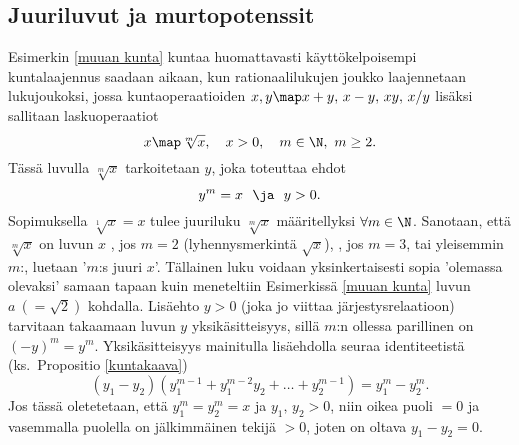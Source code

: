 \subsection*{Juuriluvut ja murtopotenssit}

Esimerkin \ref{muuan kunta} kuntaa huomattavasti käyttökelpoisempi kuntalaajennus saadaan
aikaan, kun rationaalilukujen joukko laajennetaan lukujoukoksi, jossa kuntaoperaatioiden
$x,y \map x+y,\,x-y,\,xy,\,x/y$ lisäksi sallitaan laskuoperaatiot
\[
x \map \sqrt[m]{x}, \quad x>0, \quad m\in\N,\ m \ge 2.
\]
%
Tässä luvulla $\sqrt[m]{x}$ tarkoitetaan  $y$, joka toteuttaa ehdot
\[
y^m = x\ \ \ja\ \ y>0.
\]
Sopimuksella $\sqrt[1]{x}=x$ tulee juuriluku $\sqrt[m]{x}$ määritellyksi $\forall m\in\N$.
Sanotaan, että $\sqrt[m]{x}$ on luvun $x$ , jos $m=2$
(lyhennysmerkintä $\sqrt{x}$), , jos $m=3$, tai  yleisemmin $m$:,
luetaan '$m$:s juuri $x$'. Tällainen luku voidaan yksinkertaisesti sopia 'olemassa olevaksi'
samaan tapaan kuin meneteltiin Esimerkissä \ref{muuan kunta} luvun $a\ (=\sqrt{2})$ kohdalla.
Lisäehto $y>0$ (joka jo viittaa järjestysrelaatioon) tarvitaan takaamaan luvun $y$
yksikäsitteisyys, sillä $m$:n ollessa parillinen on $(-y)^m=y^m$. Yksikäsitteisyys mainitulla
lisäehdolla seuraa identiteetistä (ks.\ Propositio \ref{kuntakaava})
\[
(y_1-y_2)(y_1^{m-1}+y_1^{m-2}y_2+ \ldots + y_2^{m-1}) = y_1^m-y_2^m.
\]
Jos tässä oletetetaan, että $y_1^m=y_2^m=x$ ja $y_1,\,y_2>0$, niin oikea puoli $=0$ ja vasemmalla
puolella on jälkimmäinen tekijä $>0$, joten on oltava $y_1-y_2=0$.  

